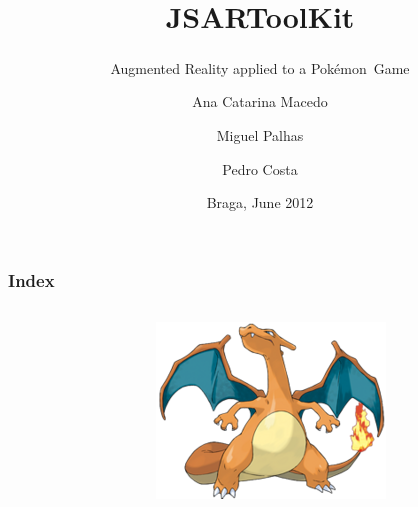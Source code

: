 \documentclass{beamer}
\title{JSARToolKit}
\subtitle{Augmented Reality applied to a Pokémon\textsuperscript{\textregistered}\ Game}
\author[A.C.Macedo \and M.Palhas \and P.Costa]{Ana Catarina Macedo
\and Miguel Palhas
\and Pedro Costa}
\institute[]{
	University of Minho\\
	Department of Informatics
}
\date{Braga, June 2012}
\begin{document}

\frame[plain]{\titlepage}

\begin{frame}
	\frametitle{Index}
	\begin{columns}
		\begin{column}{0.4\linewidth}
			\tableofcontents
		\end{column}
		\begin{column}{0.5\linewidth}
			\begin{figure}
				\begin{center}
					\includegraphics[width=\textwidth]{slides/images/charizard.png}
				\end{center}
			\end{figure}
		\end{column}
	\end{columns}
\end{frame}
\end{document}

